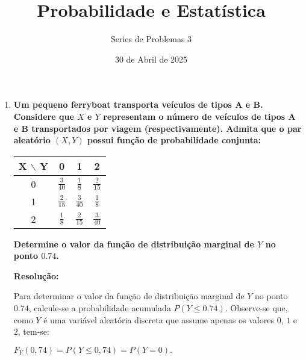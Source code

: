 \documentclass[a4paper,12pt]{article}
\author{Series de Problemas 3}
\begin{document}
\title{Probabilidade e Estatística}
\date{30 de Abril de 2025}
\maketitle

\begin{enumerate}
  \item \textbf{Um pequeno ferryboat transporta veículos de tipos A e B. Considere que 
  $X$ e $Y$ representam o número de veículos de tipos A e B transportados por viagem (respectivamente). Admita que o par aleatório 
  $(X, Y)$ possui função de probabilidade conjunta:}

  \vspace{0.3cm}

  \begin{center}
    \small                      %
    \renewcommand{\arraystretch}{1.8}  %
    \setlength{\tabcolsep}{12pt}       %
    \begin{tabular}{|c|c|c|c|}
      \hline
      X \(\backslash\) Y & 0 & 1 & 2 \\ \hline
      0 & $\frac{3}{40}$ & $\frac{1}{8}$   & $\frac{2}{15}$ \\ \hline
      1 & $\frac{2}{15}$ & $\frac{3}{40}$ & $\frac{1}{8}$   \\ \hline
      2 & $\frac{1}{8}$  & $\frac{2}{15}$ & $\frac{3}{40}$ \\ \hline
    \end{tabular}
  \end{center}

  \textbf{Determine o valor da função de distribuição marginal de $Y$ no ponto $0.74$.}

  \vspace{0.3cm}

  \begin{mdframed}[backgroundcolor=gray!10, linewidth=0pt, innertopmargin=10pt, innerbottommargin=10pt]
  \textbf{Resolução:}
  
  Para determinar o valor da função de distribuição marginal de $Y$ no ponto $0.74$, calcule-se a probabilidade acumulada $P(Y \leq 0.74)$. Observe-se que, como $Y$ é uma variável aleatória discreta que assume apenas os valores $0$, $1$ e $2$, tem-se:
  
  \begin{center}
  $F_Y(0,74) = P(Y \leq 0,74) = P(Y = 0).$
  \end{center}


\end{mdframed}
\end{enumerate}
\end{document}
